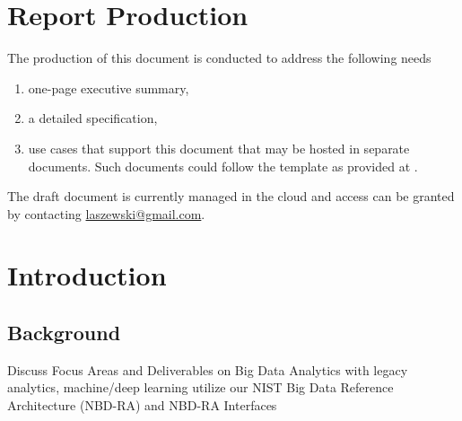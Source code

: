 
\section*{Report Production}


The production of this document is conducted to address the following
needs

\begin{enumerate}
  \item one-page executive summary,

  \item a detailed specification,

  \item use cases that support this document that may be hosted in
    separate documents. Such documents could follow the template as
    provided at \cite{nist-bigdatawg}.

\end{enumerate}


\parindent0pt The draft document is currently managed in the cloud and access can be
granted by contacting \url{laszewski@gmail.com}.


\section{Introduction}



\subsection{Background}

Discuss Focus Areas and Deliverables on Big Data Analytics with legacy
analytics, machine/deep learning utilize our NIST Big Data Reference
Architecture (NBD-RA) and NBD-RA Interfaces

